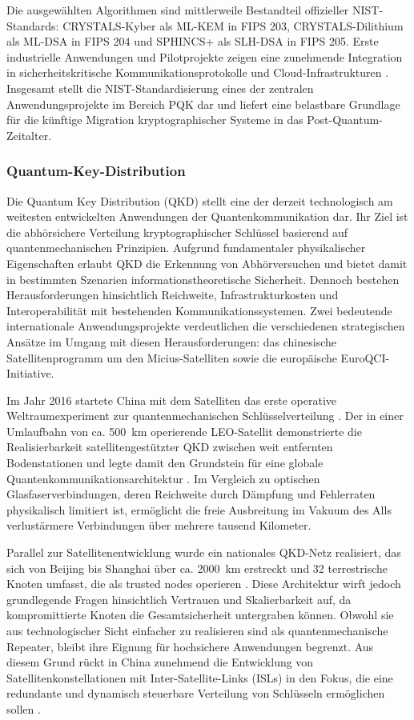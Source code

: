 Die ausgewählten Algorithmen sind mittlerweile Bestandteil offizieller NIST-Standards: CRYSTALS-Kyber als ML-KEM in FIPS 203, CRYSTALS-Dilithium als ML-DSA in FIPS 204 und SPHINCS+ als SLH-DSA in FIPS 205. Erste industrielle Anwendungen und Pilotprojekte zeigen eine zunehmende Integration in sicherheitskritische Kommunikationsprotokolle und Cloud-Infrastrukturen \cite{alagic_status_2025, sullivan_securing_2020, weibel_round_2020}. Insgesamt stellt die NIST-Standardisierung eines der zentralen Anwendungsprojekte im Bereich PQK dar und liefert eine belastbare Grundlage für die künftige Migration kryptographischer Systeme in das Post-Quantum-Zeitalter.

\subsubsection{Quantum-Key-Distribution}

Die Quantum Key Distribution (QKD) stellt eine der derzeit technologisch am weitesten entwickelten Anwendungen der Quantenkommunikation dar. Ihr Ziel ist die abhörsichere Verteilung kryptographischer Schlüssel basierend auf quantenmechanischen Prinzipien. Aufgrund fundamentaler physikalischer Eigenschaften erlaubt QKD die Erkennung von Abhörversuchen und bietet damit in bestimmten Szenarien informationstheoretische Sicherheit. Dennoch bestehen Herausforderungen hinsichtlich Reichweite, Infrastrukturkosten und Interoperabilität mit bestehenden Kommunikationssystemen. Zwei bedeutende internationale Anwendungsprojekte verdeutlichen die verschiedenen strategischen Ansätze im Umgang mit diesen Herausforderungen: das chinesische Satellitenprogramm um den Micius-Satelliten sowie die europäische EuroQCI-Initiative.

Im Jahr 2016 startete China mit dem Satelliten \cite{courtland_chinas_2016} das erste operative Weltraumexperiment zur quantenmechanischen Schlüsselverteilung \cite{courtland_chinas_2016}. Der in einer Umlaufbahn von ca. 500~km operierende LEO-Satellit demonstrierte die Realisierbarkeit satellitengestützter QKD zwischen weit entfernten Bodenstationen und legte damit den Grundstein für eine globale Quantenkommunikationsarchitektur \cite{wang_modeling_2021}. Im Vergleich zu optischen Glasfaserverbindungen, deren Reichweite durch Dämpfung und Fehlerraten physikalisch limitiert ist, ermöglicht die freie Ausbreitung im Vakuum des Alls verlustärmere Verbindungen über mehrere tausend Kilometer.

Parallel zur Satellitenentwicklung wurde ein nationales QKD-Netz realisiert, das sich von Beijing bis Shanghai über ca. 2000~km erstreckt und 32 terrestrische Knoten umfasst, die als trusted nodes operieren \cite{wang_modeling_2021}. Diese Architektur wirft jedoch grundlegende Fragen hinsichtlich Vertrauen und Skalierbarkeit auf, da kompromittierte Knoten die Gesamtsicherheit untergraben können. Obwohl sie aus technologischer Sicht einfacher zu realisieren sind als quantenmechanische Repeater, bleibt ihre Eignung für hochsichere Anwendungen begrenzt. Aus diesem Grund rückt in China zunehmend die Entwicklung von Satellitenkonstellationen mit Inter-Satellite-Links (ISLs) in den Fokus, die eine redundante und dynamisch steuerbare Verteilung von Schlüsseln ermöglichen sollen \cite{wang_modeling_2021}.

